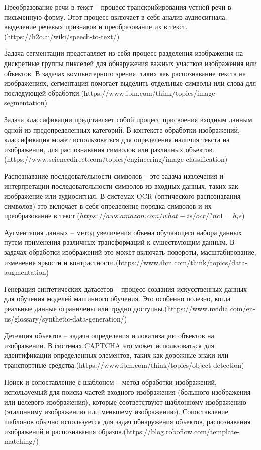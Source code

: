 Преобразование речи в текст -- процесс транскрибирования устной речи в письменную 
форму. Этот процесс включает в себя анализ аудиосигнала, выделение речевых 
признаков и преобразование их в текст.(https://h2o.ai/wiki/speech-to-text/)

Задача сегментации представляет из себя процесс разделения изображения на 
дискретные группы пикселей для обнаружения важных участков изображения или 
объектов. В задачах компьютерного зрения, таких как распознавание текста на 
изображениях, сегментация помогает выделить отдельные символы или слова для 
последующей обработки.(https://www.ibm.com/think/topics/image-segmentation)

Задача классификации представляет собой процесс присвоения входным данным одной 
из предопределенных категорий. В контексте обработки изображений, классификация 
может использоваться для определения наличия текста на изображении, для 
распознавания символов или различных объектов.(https://www.sciencedirect.com/topics/engineering/image-classification)

Распознавание последовательности символов -- это задача извлечения и 
интерпретации последовательности символов из входных данных, таких как 
изображение или аудиосигнал. В системах OCR (оптического распознавания символов) 
это включает в себя определение порядка символов и их преобразование в текст.($https://aws.amazon.com/what-is/ocr/?nc1=h_ls$)

Аугментация данных -- метод увеличения объема обучающего набора данных путем 
применения различных трансформаций к существующим данным. В задачах обработки 
изображений это может включать повороты, масштабирование, изменение яркости и 
контрастности.(https://www.ibm.com/think/topics/data-augmentation)

Генерация синтетических датасетов -- процесс создания искусственных данных для 
обучения моделей машинного обучения. Это особенно полезно, когда реальные данные 
ограничены или трудно доступны.(https://www.nvidia.com/en-us/glossary/synthetic-data-generation/)

Детекция объектов -- задача определения и локализации объектов на изображении. В 
системах CAPTCHA это может использоваться для идентификации определенных 
элементов, таких как дорожные знаки или транспортные средства.(https://www.ibm.com/think/topics/object-detection)

Поиск и сопоставление с шаблоном -- метод обработки изображений, используемый 
для поиска частей входного изображения (большого изображения или целевого 
изображения), которые соответствуют шаблонному изображению (эталонному 
изображению или меньшему изображению). Сопоставление шаблонов обычно 
используется для задач обнаружения объектов, распознавания изображений и 
распознавания образов.(https://blog.roboflow.com/template-matching/)


